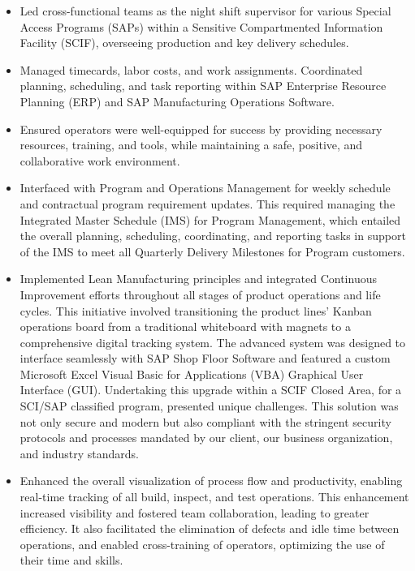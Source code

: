 \documentclass[AutoFakeBold]{resume}
\begin{document}
\begin{itemize}
    \item Led cross-functional teams as the night shift supervisor for various Special Access Programs (SAPs) within a Sensitive Compartmented Information Facility (SCIF), overseeing production and key delivery schedules. 
    \item Managed timecards, labor costs, and work assignments. Coordinated planning, scheduling, and task reporting within SAP Enterprise Resource Planning (ERP) and SAP Manufacturing Operations Software. 
    \item Ensured operators were well-equipped for success by providing necessary resources, training, and tools, while maintaining a safe, positive, and collaborative work environment.
    \item Interfaced with Program and Operations Management for weekly schedule and contractual program requirement updates. This required managing the Integrated Master Schedule (IMS) for Program Management, which entailed the overall planning, scheduling, coordinating, and reporting tasks in support of the IMS to meet all Quarterly Delivery Milestones for Program customers.
    \item Implemented Lean Manufacturing principles and integrated Continuous Improvement efforts throughout all stages of product operations and life cycles. This initiative involved transitioning the product lines' Kanban operations board from a traditional whiteboard with magnets to a comprehensive digital tracking system. The advanced system was designed to interface seamlessly with SAP Shop Floor Software and featured a custom Microsoft Excel Visual Basic for Applications (VBA) Graphical User Interface (GUI). Undertaking this upgrade within a SCIF Closed Area, for a SCI/SAP classified program, presented unique challenges. This solution was not only secure and modern but also compliant with the stringent security protocols and processes mandated by our client, our business organization, and industry standards.
    \item Enhanced the overall visualization of process flow and productivity, enabling real-time tracking of all build, inspect, and test operations. This enhancement increased visibility and fostered team collaboration, leading to greater efficiency. It also facilitated the elimination of defects and idle time between operations, and enabled cross-training of operators, optimizing the use of their time and skills.
\end{itemize}
\vspace{5mm}
\end{document}
